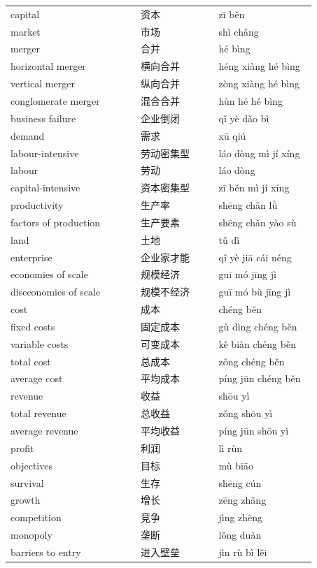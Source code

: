 \documentclass[11pt]{article}
\begin{document}
\begin{longtable}{@{}p{0.40\linewidth}p{0.24\linewidth}p{0.30\linewidth}@{}}
capital & 资本 & zī běn \\
market & 市场 & shì chǎng \\
merger & 合并 & hé bìng \\
horizontal merger & 横向合并 & héng xiàng hé bìng \\
vertical merger & 纵向合并 & zòng xiàng hé bìng \\
conglomerate merger & 混合合并 & hùn hé hé bìng \\
business failure & 企业倒闭 & qǐ yè dǎo bì \\
demand & 需求 & xū qiú \\
labour-intensive & 劳动密集型 & láo dòng mì jí xíng \\
labour & 劳动 & láo dòng \\
capital-intensive & 资本密集型 & zī běn mì jí xíng \\
productivity & 生产率 & shēng chǎn lǜ \\
factors of production & 生产要素 & shēng chǎn yào sù \\
land & 土地 & tǔ dì \\
enterprise & 企业家才能 & qǐ yè jiā cái néng \\
economies of scale & 规模经济 & guī mó jīng jì \\
diseconomies of scale & 规模不经济 & guī mó bù jīng jì \\
cost & 成本 & chéng běn \\
fixed costs & 固定成本 & gù dìng chéng běn \\
variable costs & 可变成本 & kě biàn chéng běn \\
total cost & 总成本 & zǒng chéng běn \\
average cost & 平均成本 & píng jūn chéng běn \\
revenue & 收益 & shōu yì \\
total revenue & 总收益 & zǒng shōu yì \\
average revenue & 平均收益 & píng jūn shōu yì \\
profit & 利润 & lì rùn \\
objectives & 目标 & mù biāo \\
survival & 生存 & shēng cún \\
growth & 增长 & zēng zhǎng \\
competition & 竞争 & jìng zhēng \\
monopoly & 垄断 & lǒng duàn \\
barriers to entry & 进入壁垒 & jìn rù bì lěi \\
\end{longtable}
\end{document}
